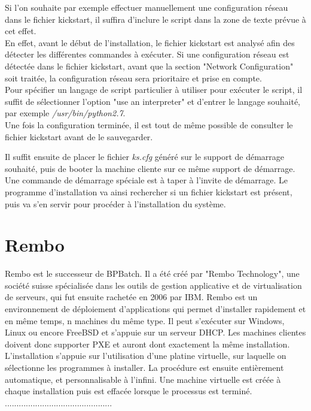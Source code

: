 \documentclass[a4paper,12pt,one side,titlepage]{report}
\begin{document}
\vspace{1em}
Si l'on souhaite par exemple effectuer manuellement une configuration réseau dans le fichier kickstart, il suffira d'inclure le script dans la zone de texte prévue à cet effet.\\
En effet, avant le début de l'installation, le fichier kickstart est analysé afin des détecter les différentes commandes à exécuter. Si une configuration réseau est détectée dans le fichier kickstart, avant que la section "Network Configuration" soit traitée, la configuration réseau sera prioritaire et prise en compte.\\
Pour spécifier un langage de script particulier à utiliser pour exécuter le script, il suffit de sélectionner l'option "use an interpreter" et d'entrer le langage souhaité, par exemple \textit{/usr/bin/python2.7}.\\

Une fois la configuration terminée, il est tout de même possible de consulter le fichier kickstart avant de le sauvegarder.

Il suffit ensuite de placer le fichier \textit{ks.cfg} généré sur le support de démarrage souhaité, puis de booter la machine cliente sur ce même support de démarrage. Une commande de démarrage spéciale est à taper à l'invite de démarrage. Le programme d'installation va ainsi rechercher si un fichier kickstart est présent, puis va s'en servir pour procéder à l'installation du système.

\section{Rembo}
Rembo est le successeur de BPBatch. Il a été créé par "Rembo Technology", une société suisse spécialisée dans les outils de gestion applicative et de virtualisation de serveurs, qui fut ensuite rachetée en 2006 par IBM. Rembo est un environnement de déploiement d'applications qui permet d'installer rapidement et en même temps, n machines du même type. Il peut s’exécuter sur Windows, Linux ou encore FreeBSD et s’appuie sur un serveur DHCP. Les machines clientes doivent donc supporter PXE et auront dont exactement la même installation.\\

L'installation s'appuie sur l'utilisation d'une platine virtuelle, sur laquelle on sélectionne les programmes à installer. La procédure est ensuite entièrement automatique, et personnalisable à l'infini. Une machine virtuelle est créée à chaque installation puis est effacée lorsque le processus est terminé.\\
..............................................
\end{document}
